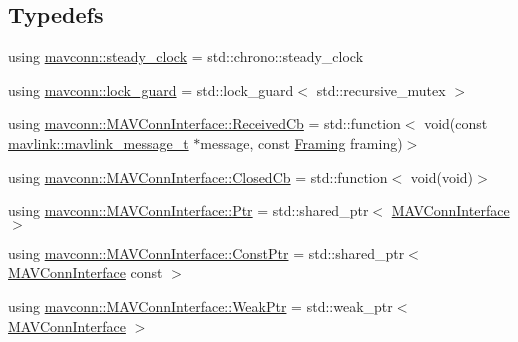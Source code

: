 \subsection*{Typedefs}
\begin{DoxyCompactItemize}
\item 
using \mbox{\hyperlink{group__mavconn_gab7fe4e29d643505aafb15c532a9338d3}{mavconn\+::steady\+\_\+clock}} = std\+::chrono\+::steady\+\_\+clock
\item 
using \mbox{\hyperlink{group__mavconn_ga46feb20496b24d733abd4e68ef29bc90}{mavconn\+::lock\+\_\+guard}} = std\+::lock\+\_\+guard$<$ std\+::recursive\+\_\+mutex $>$
\item 
using \mbox{\hyperlink{group__mavconn_ga1d04ead963f1685f3aaf4b18ffb49ff7}{mavconn\+::\+M\+A\+V\+Conn\+Interface\+::\+Received\+Cb}} = std\+::function$<$ void(const \mbox{\hyperlink{include__v0_89_2mavlink__types_8h_a63b963764c09dc72f4910c1521e325b9}{mavlink\+::mavlink\+\_\+message\+\_\+t}} $\ast$message, const \mbox{\hyperlink{group__mavconn_gac93e6f8262bcc6008b4882ae6213f494}{Framing}} framing)$>$
\item 
using \mbox{\hyperlink{group__mavconn_ga6eef19e745c84f9b0b85d704b2e3e430}{mavconn\+::\+M\+A\+V\+Conn\+Interface\+::\+Closed\+Cb}} = std\+::function$<$ void(void)$>$
\item 
using \mbox{\hyperlink{group__mavconn_gaff41078b805e1d8f85ed6fd2d87711ce}{mavconn\+::\+M\+A\+V\+Conn\+Interface\+::\+Ptr}} = std\+::shared\+\_\+ptr$<$ \mbox{\hyperlink{classmavconn_1_1MAVConnInterface}{M\+A\+V\+Conn\+Interface}} $>$
\item 
using \mbox{\hyperlink{group__mavconn_ga47036145ce30f67fcd830e28712216eb}{mavconn\+::\+M\+A\+V\+Conn\+Interface\+::\+Const\+Ptr}} = std\+::shared\+\_\+ptr$<$ \mbox{\hyperlink{classmavconn_1_1MAVConnInterface}{M\+A\+V\+Conn\+Interface}} const  $>$
\item 
using \mbox{\hyperlink{group__mavconn_ga010ca3b237199e0ebb7b850b1f3ea0ba}{mavconn\+::\+M\+A\+V\+Conn\+Interface\+::\+Weak\+Ptr}} = std\+::weak\+\_\+ptr$<$ \mbox{\hyperlink{classmavconn_1_1MAVConnInterface}{M\+A\+V\+Conn\+Interface}} $>$
\end{DoxyCompactItemize}
